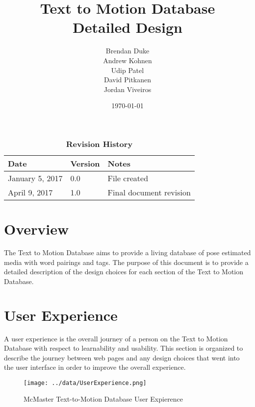 \documentclass{scrreprt}
\begin{document}
\title{\bf Text to Motion Database\\[\baselineskip]\Large Detailed Design}
\author{Brendan Duke\\Andrew Kohnen\\Udip Patel\\David Pitkanen\\Jordan Viveiros}
\date{\today}

\maketitle

\tableofcontents


\begin{table}[bp]
\caption*{\bf Revision History}
\begin{tabularx}{\textwidth}{p{3.5cm}p{2cm}X}
\toprule {\bf Date} & {\bf Version} & {\bf Notes}\\
\midrule
January 5, 2017 & 0.0 & File created\\
April 9, 2017 & 1.0 & Final document revision \\
\bottomrule
\end{tabularx}
\end{table}

\newpage


\chapter{Overview}

The Text to Motion Database aims to provide a living database of pose estimated
media with word pairings and tags. The purpose of this document is to provide a
detailed description of the design choices for each section of the Text to
Motion Database.

\chapter{User Experience}

A user experience is the overall journey of a person on the Text to Motion
Database with respect to learnability and usability. This section is organized
to describe the journey between web pages and any design choices that went into
the user interface in order to improve the overall experience.

\begin{figure}[!ht]
        \caption{McMaster Text-to-Motion Database User Expierence}
        \label{userExp}
        \centering
        \texttt{[image: ../data/UserExperience.png]}
\end{figure}
\end{document}
